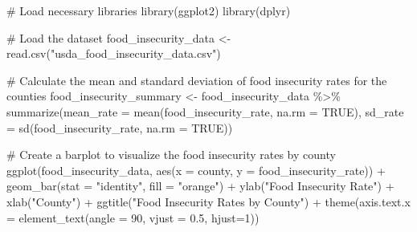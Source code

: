 \documentclass[
  letterpaper,
  DIV=11,
  numbers=noendperiod]{scrreprt}
\newenvironment{Shaded}{\begin{snugshade}}{\end{snugshade}}
\newcommand{\AttributeTok}[1]{\textcolor[rgb]{0.40,0.45,0.13}{#1}}
\newcommand{\CommentTok}[1]{\textcolor[rgb]{0.37,0.37,0.37}{#1}}
\newcommand{\ConstantTok}[1]{\textcolor[rgb]{0.56,0.35,0.01}{#1}}
\newcommand{\DecValTok}[1]{\textcolor[rgb]{0.68,0.00,0.00}{#1}}
\newcommand{\FloatTok}[1]{\textcolor[rgb]{0.68,0.00,0.00}{#1}}
\newcommand{\FunctionTok}[1]{\textcolor[rgb]{0.28,0.35,0.67}{#1}}
\newcommand{\NormalTok}[1]{\textcolor[rgb]{0.00,0.23,0.31}{#1}}
\newcommand{\OtherTok}[1]{\textcolor[rgb]{0.00,0.23,0.31}{#1}}
\newcommand{\SpecialCharTok}[1]{\textcolor[rgb]{0.37,0.37,0.37}{#1}}
\newcommand{\StringTok}[1]{\textcolor[rgb]{0.13,0.47,0.30}{#1}}
\begin{document}
\begin{Shaded}
\begin{Highlighting}[]
\CommentTok{\# Load necessary libraries}
\FunctionTok{library}\NormalTok{(ggplot2)}
\FunctionTok{library}\NormalTok{(dplyr)}

\CommentTok{\# Load the dataset}
\NormalTok{food\_insecurity\_data }\OtherTok{\textless{}{-}} \FunctionTok{read.csv}\NormalTok{(}\StringTok{"usda\_food\_insecurity\_data.csv"}\NormalTok{)}

\CommentTok{\# Calculate the mean and standard deviation of food insecurity rates for the counties}
\NormalTok{food\_insecurity\_summary }\OtherTok{\textless{}{-}}\NormalTok{ food\_insecurity\_data }\SpecialCharTok{\%\textgreater{}\%}
  \FunctionTok{summarize}\NormalTok{(}\AttributeTok{mean\_rate =} \FunctionTok{mean}\NormalTok{(food\_insecurity\_rate, }\AttributeTok{na.rm =} \ConstantTok{TRUE}\NormalTok{),}
            \AttributeTok{sd\_rate =} \FunctionTok{sd}\NormalTok{(food\_insecurity\_rate, }\AttributeTok{na.rm =} \ConstantTok{TRUE}\NormalTok{))}

\CommentTok{\# Create a barplot to visualize the food insecurity rates by county}
\FunctionTok{ggplot}\NormalTok{(food\_insecurity\_data, }\FunctionTok{aes}\NormalTok{(}\AttributeTok{x =}\NormalTok{ county, }\AttributeTok{y =}\NormalTok{ food\_insecurity\_rate)) }\SpecialCharTok{+}
  \FunctionTok{geom\_bar}\NormalTok{(}\AttributeTok{stat =} \StringTok{"identity"}\NormalTok{, }\AttributeTok{fill =} \StringTok{"orange"}\NormalTok{) }\SpecialCharTok{+}
  \FunctionTok{ylab}\NormalTok{(}\StringTok{"Food Insecurity Rate"}\NormalTok{) }\SpecialCharTok{+} \FunctionTok{xlab}\NormalTok{(}\StringTok{"County"}\NormalTok{) }\SpecialCharTok{+} 
  \FunctionTok{ggtitle}\NormalTok{(}\StringTok{"Food Insecurity Rates by County"}\NormalTok{) }\SpecialCharTok{+} 
  \FunctionTok{theme}\NormalTok{(}\AttributeTok{axis.text.x =} \FunctionTok{element\_text}\NormalTok{(}\AttributeTok{angle =} \DecValTok{90}\NormalTok{, }\AttributeTok{vjust =} \FloatTok{0.5}\NormalTok{, }\AttributeTok{hjust=}\DecValTok{1}\NormalTok{))}


\end{Highlighting}
\end{Shaded}
\end{document}

